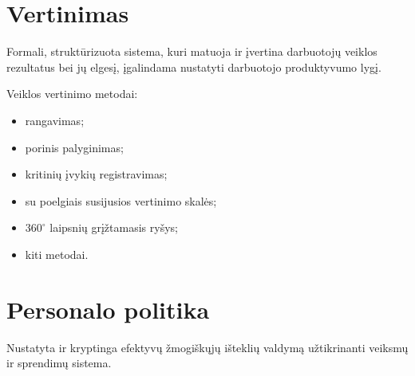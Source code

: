 \section{Vertinimas}

\begin{defn}
  Formali, struktūrizuota sistema, kuri matuoja ir įvertina darbuotojų
  veiklos rezultatus bei jų elgesį, įgalindama nustatyti darbuotojo
  produktyvumo lygį.
\end{defn}

Veiklos vertinimo metodai:
\begin{itemize}
  \item rangavimas;
  \item porinis palyginimas;
  \item kritinių įvykių registravimas;
  \item su poelgiais susijusios vertinimo skalės;
  \item $360^{\circ}$ laipsnių grįžtamasis ryšys;
  \item kiti metodai.
\end{itemize}

\section{Personalo politika}

\begin{defn}
  Nustatyta ir kryptinga efektyvų žmogiškųjų išteklių valdymą užtikrinanti
  veiksmų ir sprendimų sistema.
\end{defn}


